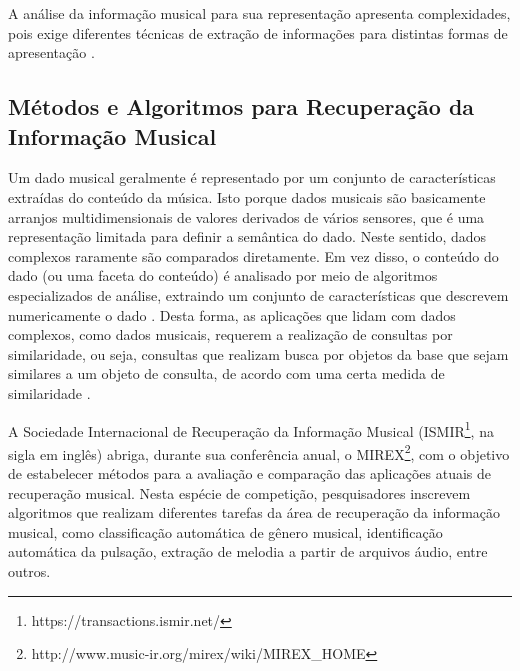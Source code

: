 A análise da informação musical para sua representação apresenta complexidades, pois exige diferentes técnicas de extração de informações para distintas formas de apresentação \cite{downie2003}.

\subsection{Métodos e Algoritmos para Recuperação da Informação Musical} \label{subsec:metodos-algoritmos-recuperacao}

Um dado musical geralmente é representado por um conjunto de características extraídas do conteúdo da música. Isto porque dados musicais são basicamente arranjos multidimensionais de valores derivados de vários sensores, que é uma representação limitada para definir a semântica do dado. Neste sentido, dados complexos raramente são comparados diretamente. Em vez disso, o conteúdo do dado (ou uma faceta do conteúdo) é analisado por meio de algoritmos especializados de análise, extraindo um conjunto de características que descrevem numericamente o dado \cite{kaster2012}. Desta forma, as aplicações que lidam com dados complexos, como dados musicais, requerem a realização de consultas por similaridade, ou seja, consultas que realizam busca por objetos da base que sejam similares a um objeto de consulta, de acordo com uma certa medida de similaridade \cite{barioni2006}.

A Sociedade Internacional de Recuperação da Informação Musical (ISMIR\footnote{https://transactions.ismir.net/}, na sigla em inglês) abriga, durante sua conferência anual, o MIREX\footnote{http://www.music-ir.org/mirex/wiki/MIREX\_HOME}, com o objetivo de estabelecer métodos para a avaliação e comparação das aplicações atuais de recuperação musical. Nesta espécie de competição, pesquisadores inscrevem algoritmos que realizam diferentes tarefas da área de recuperação da informação musical, como classificação automática de gênero musical, identificação automática da pulsação, extração de melodia a partir de arquivos áudio, entre outros.

